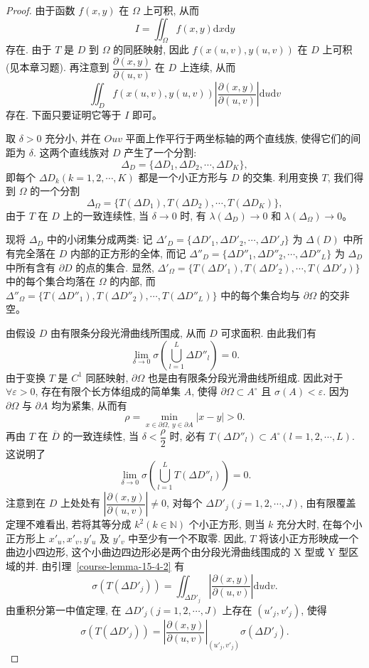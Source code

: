 \documentclass[12pt,fontset=fandol]{ctexart}
\begin{document}
\begin{proof}\quad 由于函数 $f(x,y)$ 在 $\Omega$ 上可积, 从而
\[
  I=\iint_\Omega f(x,y)\mathrm dx\mathrm dy
\]
存在. 由于 $T$ 是 $D$ 到 $\Omega$ 的同胚映射, 因此 $f(x(u,v),y(u,v))$ 在 $D$ 上可积(见本章习题). 再注意到 $\dfrac{\partial(x,y)}{\partial(u,v)}$ 在 $D$ 上连续, 从而
\[
  \iint_D f(x(u,v),y(u,v))
  \left|\frac{\partial(x,y)}{\partial(u,v)}\right|\mathrm du\mathrm dv
\]
存在. 下面只要证明它等于 $I$ 即可。

取 $\delta>0$ 充分小, 并在 $Ouv$ 平面上作平行于两坐标轴的两个直线族, 使得它们的间距为 $\delta$. 这两个直线族对 $D$ 产生了一个分割:
\[
  \Delta_D=\{\Delta D_1,\Delta D_2,\cdots,\Delta D_K\},
\]
即每个 $\Delta D_k(k=1,2,\cdots,K)$ 都是一个小正方形与 $D$ 的交集. 利用变换 $T$, 我们得到 $\Omega$ 的一个分割
\[
  \Delta_\Omega=\{T(\Delta D_1),T(\Delta D_2),\cdots,T(\Delta D_K)\},
\]
由于 $T$ 在 $D$ 上的一致连续性, 当 $\delta\to0$ 时, 有 $\lambda(\Delta_D)\to0$ 和 $\lambda(\Delta_\Omega)\to0$。

现将 $\Delta_D$ 中的小闭集分成两类: 记 $\Delta'_D=\{\Delta D'_1,\Delta D'_2,\cdots,\Delta D'_J\}$ 为 $\Delta(D)$ 中所有完全落在 $D$ 内部的正方形的全体, 而记 $\Delta''_D=\{\Delta D''_1,\Delta D''_2,\cdots,\Delta D''_L\}$ 为 $\Delta_D$ 中所有含有 $\partial D$ 的点的集合. 显然, $\Delta'_\Omega=\{T(\Delta D'_1),T(\Delta D'_2),\cdots,T(\Delta D'_J)\}$ 中的每个集合均落在 $\Omega$ 的内部, 而 $\Delta''_\Omega=\{T(\Delta D''_1),T(\Delta D''_2),\cdots,T(\Delta D''_L)\}$ 中的每个集合均与 $\partial\Omega$ 的交非空。

由假设 $D$ 由有限条分段光滑曲线所围成, 从而 $D$ 可求面积. 由此我们有
\[
  \lim_{\delta\to0}\sigma\left(\bigcup_{l=1}^L\Delta D''_l\right)=0.
\]
由于变换 $T$ 是 $C^1$ 同胚映射, $\partial\Omega$ 也是由有限条分段光滑曲线所组成. 因此对于 $\forall\varepsilon>0$, 存在有限个长方体组成的简单集 $A$, 使得 $\partial\Omega\subset A^\circ$ 且 $\sigma(A)<\varepsilon$. 因为 $\partial\Omega$ 与 $\partial A$ 均为紧集, 从而有
\[
  \rho=\min_{x\in\partial\Omega,\ y\in\partial A}|x-y|>0.
\]
再由 $T$ 在 $\overline D$ 的一致连续性, 当 $\delta<\dfrac\rho2$ 时, 必有 $T(\Delta D''_l)\subset A^\circ(l=1,2,\cdots,L)$. 这说明了
\[
  \lim_{\delta\to0}\sigma\left(\bigcup_{l=1}^LT(\Delta D''_l)\right)=0.
\]
注意到在 $D$ 上处处有 $\left|\dfrac{\partial(x,y)}{\partial(u,v)}\right|\ne0$, 对每个 $\Delta D'_j(j=1,2,\cdots,J)$, 由有限覆盖定理不难看出, 若将其等分成 $k^2(k\in\mathbb N)$ 个小正方形, 则当 $k$ 充分大时, 在每个小正方形上 $x'_u,x'_v,y'_u$ 及 $y'_v$ 中至少有一个不取零. 因此, $T$ 将该小正方形映成一个曲边小四边形, 这个小曲边四边形必是两个由分段光滑曲线围成的 X 型或 Y 型区域的并. 由引理~\ref{course-lemma-15-4-2}  有
\[
  \sigma(T(\Delta D'_j))
  =\iint_{\Delta D'_j}\left|\frac{\partial(x,y)}{\partial(u,v)}\right|\mathrm du\mathrm dv.
\]
由重积分第一中值定理, 在 $\Delta D'_j(j=1,2,\cdots,J)$ 上存在 $(u'_j,v'_j)$, 使得
\[
  \sigma(T(\Delta D'_j))
  =\left|\frac{\partial(x,y)}{\partial(u,v)}\right|_{(u'_j,v'_j)}
  \sigma(\Delta D'_j).
\]


\end{proof}
\end{document}
